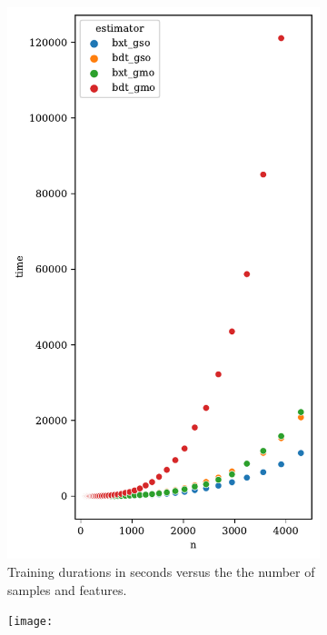 \begin{figure}[h]
    \centering
    \begin{subfigure}{0.49\textwidth}
        \includegraphics[width=\textwidth]{
            experiments/empirical_complexity/time_vs_n_artificial_data.pdf
        }
        \caption{Training durations in seconds versus the the number of samples and features.}
    \end{subfigure}
    \begin{subfigure}{0.49\textwidth}
        \texttt{[image: 
}
\end{subfigure}
\end{figure}
